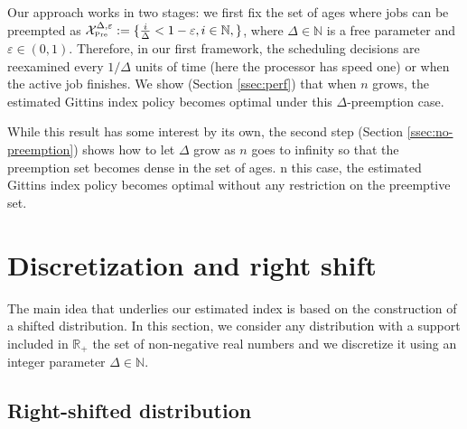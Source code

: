 \documentclass[11pt]{article}
\renewcommand{\epsilon}{\varepsilon}
\newcommand{\R}{\mathbb{R}}
\newcommand{\N}{\mathbb{N}}
\newcommand{\XP}{\mathcal{X}_{\mbox{\tiny Pre}}}
\newcommand{\xend}{x_{\sc end}}
\begin{document}
Our approach works in two stages: we first fix the set of ages where jobs can be preempted as $\XP^{\Delta,\epsilon}:= \{ \frac{i}{\Delta} < 1-\epsilon,  i \in \N, \}$, where  $\Delta \in \N$ is a free parameter and $\epsilon \in (0,1)$.
Therefore, in our first framework,  the scheduling decisions are reexamined every $1/\Delta$ units of time (here the processor has speed one) or when the active job finishes. %
We show (Section \ref{ssec:perf}) that when $n$ grows, the estimated Gittins index policy becomes optimal under this $\Delta$-preemption case.

While this result has some interest by its own, the second step (Section \ref{ssec:no-preemption}) shows how to let  $\Delta$ grow as $n$ goes to infinity so that
the preemption set becomes dense in the set of ages. n this case,  the  estimated Gittins index policy becomes optimal without any restriction on the preemptive set.






\section{Discretization and right shift}


The main idea that underlies our estimated index is based on the construction of a shifted distribution. In this section, we consider any distribution with a support included in $\R_+$ the set of non-negative real numbers and we discretize it using an integer   parameter $\Delta \in \N$.

\subsection{Right-shifted distribution}

\end{document}
